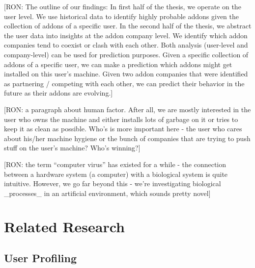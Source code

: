 \documentclass[11pt,oneside]{book}
\let\Oldsection\section
\renewcommand{\section}{\FloatBarrier\Oldsection}
\begin{document}
[RON: The outline of our findings: In first half of the thesis, we operate on the user level. We use historical data to identify highly probable addons given the collection of addons of a specific user. In the second half of the thesis, we abstract the user data into insights at the addon company level. We identify which addon companies tend to coexist or clash with each other. Both analysis (user-level and company-level) can be used for prediction purposes. Given a specific collection of addons of a specific user, we can make a prediction which addons might get installed on this user's machine. Given two addon companies that were identified as partnering / competing with each other, we can predict their behavior in the future as their addons are evolving.]

[RON: a paragraph about human factor. After all, we are mostly interested in the user who owns the machine and either installs lots of garbage on it or tries to keep it as clean as possible. Who's is more important here - the user who cares about his/her machine hygiene or the bunch of companies that are trying to push stuff on the user's machine? Who's winning?]

[RON: the term ``computer virus'' has existed for a while - the connection between a hardware system (a computer) with a biological system is quite intuitive. However, we go far beyond this - we're investigating biological \_processes\_ in an artificial environment, which sounds pretty novel]


\chapter{Related Research}
\label{sec:related}


\section{User Profiling}
\label{sec:user_profilingg}
\end{document}
